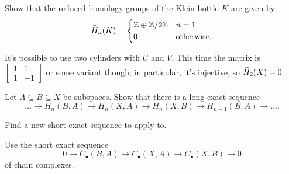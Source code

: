 \begin{sproblem}
	\onechili
	Show that the reduced homology groups of the Klein bottle $K$ are given by
	\[
		\widetilde H_n(K) =
		\begin{cases}
			\mathbb Z \oplus \mathbb Z/2\mathbb Z & n = 1 \\
			0 & \text{otherwise}.
		\end{cases}
	\]
	\begin{hint}
		It's possible to use two cylinders with $U$ and $V$.
		This time the matrix is $\begin{bmatrix} 1 & 1 \\ 1 & -1 \end{bmatrix}$
		or some variant though; in particular, it's injective, so $\widetilde H_2(X) = 0$.
	\end{hint}
\end{sproblem}

\begin{sproblem}
	\label{prob:triple_long_exact}
	Let $A \subseteq B \subseteq X$ be subspaces.
	Show that there is a long exact sequence
	\[
		\dots \to H_n(B,A) \to H_n(X,A)
		\to H_n(X,B) \to H_{n-1}(B,A) \to \dots.
	\]
	\begin{hint}
		Find a new short exact sequence
		to apply  to.
	\end{hint}
	\begin{sol}
		Use the short exact sequence
		\[ 0 \to C_\bullet(B,A) \to C_\bullet(X,A) \to C_\bullet(X,B) \to 0 \]
		of chain complexes.
	\end{sol}
\end{sproblem}
